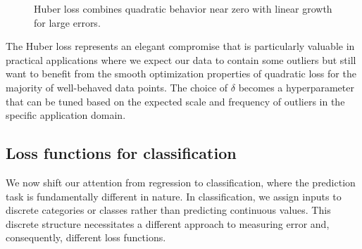 \begin{figure}[ht]
\begin{center}
\end{center}
\caption{Huber loss combines quadratic behavior near zero with linear growth for large errors.}
\end{figure}

The Huber loss represents an elegant compromise that is particularly valuable in practical applications where we expect our data to contain some outliers but still want to benefit from the smooth optimization properties of quadratic loss for the majority of well-behaved data points. The choice of $\delta$ becomes a hyperparameter that can be tuned based on the expected scale and frequency of outliers in the specific application domain.

\subsection*{Loss functions for classification}

We now shift our attention from regression to classification, where the prediction task is fundamentally different in nature. In classification, we assign inputs to discrete categories or classes rather than predicting continuous values. This discrete structure necessitates a different approach to measuring error and, consequently, different loss functions.

